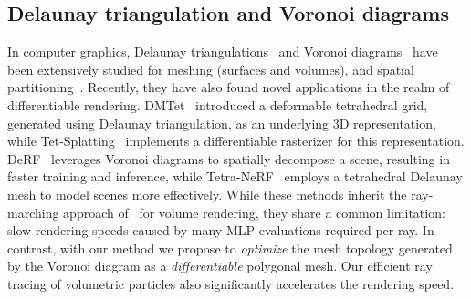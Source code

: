\subsection{Delaunay triangulation and Voronoi diagrams}
% 
In computer graphics, Delaunay triangulations~\cite{delaunay} and Voronoi diagrams~\cite{voronoi} have been extensively studied for meshing (surfaces and volumes), and spatial partitioning~\cite{delaunay_voronoi_watson, voronoi_guibas, delaunay_shewchuk}.
Recently, they have also found novel applications in the realm of differentiable rendering.
DMTet~\cite{dmtet} introduced a deformable tetrahedral grid, generated using Delaunay triangulation, as an underlying 3D representation, while Tet-Splatting~\cite{tetrasplat} implements a differentiable rasterizer for this representation.
DeRF~\cite{derf} leverages Voronoi diagrams to spatially decompose a scene, resulting in faster training and inference, while Tetra-NeRF~\cite{tetranerf} employs a tetrahedral Delaunay mesh to model scenes more effectively.
While these methods inherit the ray-marching approach of~\cite{nerf} for volume rendering, they share a common limitation: slow rendering speeds caused by many MLP evaluations required per ray.
% 
\quad
% 
In contrast, with our method we propose to \textit{optimize} the mesh topology generated by the Voronoi diagram as a \textit{differentiable} polygonal mesh.
Our efficient ray tracing of volumetric particles also significantly accelerates the rendering speed.

